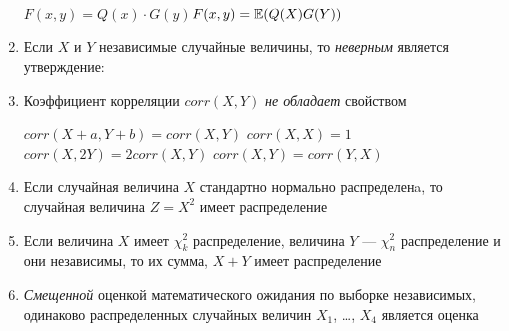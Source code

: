 \documentclass[pdftex,12pt,a4paper]{article}
\begin{document}
\begin{enumerate}
{$F(x,y)=Q(x)\cdot G(y)$}{$F(x,y)=\mathbb{E}(Q(X)G(Y))$}


\item Если $X$ и $Y$ независимые случайные величины, то \emph{неверным} является утверждение:




\item Коэффициент корреляции $corr(X,Y)$ \emph{не обладает} свойством

{$corr(X+a,Y+b)=corr(X,Y)$}
{$corr(X,X)=1$}
{$corr(X,2Y)=2corr(X,Y)$}
{$corr(X,Y)= corr(Y,X)$}




\item Если случайная величина $X$ стандартно нормально распределенa, то случайная величина $Z=X^2$ имеет распределение   


\item Если величина $X$ имеет $\chi^2_k$ распределение, величина $Y$ --- $\chi^2_n$ распределение и они независимы, то их сумма, $X+Y$ имеет распределение


\item \emph{Смещенной} оценкой математического ожидания по выборке независимых, одинаково распределенных случайных величин $X_1$, \ldots, $X_4$ является оценка


\end{enumerate}
\end{document}
